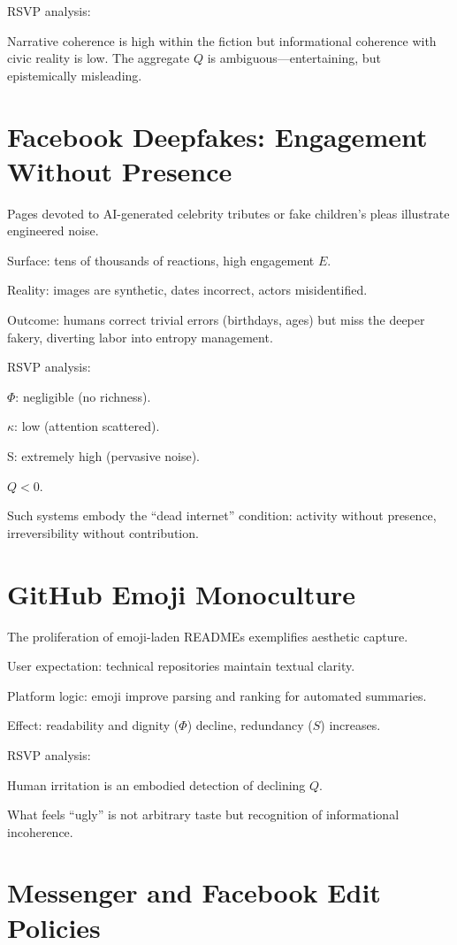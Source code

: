 \documentclass{book}
\begin{document}
RSVP analysis:

Narrative coherence is high within the fiction but informational coherence with civic reality is low. The aggregate \( Q \) is ambiguous—entertaining, but epistemically misleading.

\section{Facebook Deepfakes: Engagement Without Presence}

Pages devoted to AI-generated celebrity tributes or fake children’s pleas illustrate engineered noise.

Surface: tens of thousands of reactions, high engagement \( E \).

Reality: images are synthetic, dates incorrect, actors misidentified.

Outcome: humans correct trivial errors (birthdays, ages) but miss the deeper fakery, diverting labor into entropy management.

RSVP analysis:

\(\Phi\): negligible (no richness).

\(\kappa\): low (attention scattered).

S: extremely high (pervasive noise).

\( Q < 0 \).

Such systems embody the “dead internet” condition: activity without presence, irreversibility without contribution.

\section{GitHub Emoji Monoculture}

The proliferation of emoji-laden READMEs exemplifies aesthetic capture.

User expectation: technical repositories maintain textual clarity.

Platform logic: emoji improve parsing and ranking for automated summaries.

Effect: readability and dignity (\( \Phi \)) decline, redundancy (\( S \)) increases.

RSVP analysis:

Human irritation is an embodied detection of declining \( Q \).

What feels “ugly” is not arbitrary taste but recognition of informational incoherence.

\section{Messenger and Facebook Edit Policies}
\end{document}
